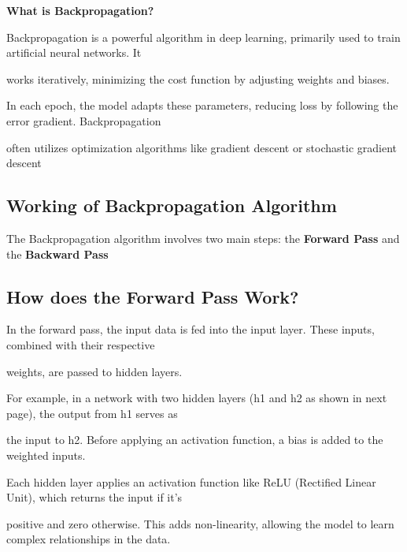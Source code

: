 	\textbf{What is Backpropagation?}
	
	\vspace{0.5cm}
	
	Backpropagation is a powerful algorithm in deep learning, primarily used to train artificial neural networks. It 
	
	works iteratively, minimizing the cost function by adjusting weights and biases.
	
	\vspace{0.2cm}
	
	In each epoch, the model adapts these parameters, reducing loss by following the error gradient. Backpropagation
	
	 often utilizes optimization algorithms like gradient descent or stochastic gradient descent 
	
	\vspace{0.5cm}
	
	\subsection{Working of Backpropagation Algorithm}
	
	\vspace{0.5cm}
	
	The Backpropagation algorithm involves two main steps: the \textbf{Forward Pass} and the \textbf{Backward Pass}
	
	\vspace{0.3cm}
	
	\subsection{How does the Forward Pass Work?}
	
	\vspace{0.3cm}
	In the forward pass, the input data is fed into the input layer. These inputs, combined with their respective 
	
	weights, are passed to hidden layers.
	
	For example, in a network with two hidden layers (h1 and h2 as shown in next page), the output from h1 serves as
	
	 the input to h2. Before applying an activation function, a bias is added to the weighted inputs.
	
	Each hidden layer applies an activation function like ReLU (Rectified Linear Unit), which returns the input if it’s
	
	 positive and zero otherwise. This adds non-linearity, allowing the model to learn complex relationships in the data.
	 
